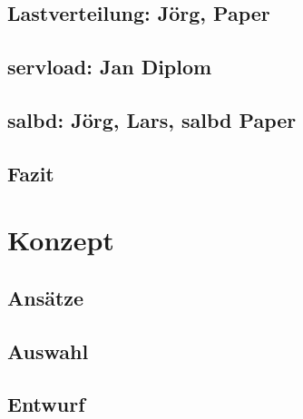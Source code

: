 \documentclass[a4paper, 11pt, toc=bibliography, toc=listof]{scrbook}
\begin{document}
		\section{Lastverteilung: Jörg, Paper} %
		\label{sec:Lastverteilung: Jörg, Paper}
		

		\section{servload: Jan Diplom} %
		\label{sec:servload: Jan Diplom}
		

		\section{salbd: Jörg, Lars, salbd Paper } %
		\label{sec:salbd: Jörg}
		

		\section{Fazit} %
		\label{sec:Fazit}
		


	\chapter{Konzept} %
	\label{cha:Konzept}

		\section{Ansätze} %
		\label{sec:Ansätze}
		

		\section{Auswahl} %
		\label{sec:Auswahl}
		

		\section{Entwurf} %
		\label{sec:Entwurf}
		
\end{document}
